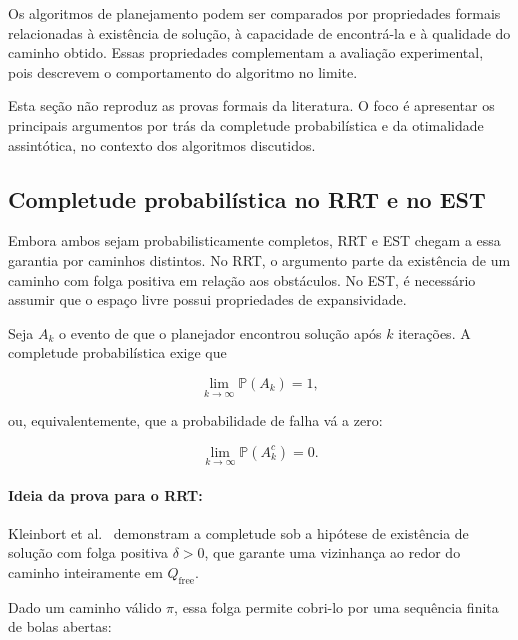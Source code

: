 Os algoritmos de planejamento podem ser comparados por propriedades formais relacionadas à existência de solução, à capacidade de encontrá-la e à qualidade do caminho obtido. Essas propriedades complementam a avaliação experimental, pois descrevem o comportamento do algoritmo no limite.

Esta seção não reproduz as provas formais da literatura. O foco é apresentar os principais argumentos por trás da completude probabilística e da otimalidade assintótica, no contexto dos algoritmos discutidos.

\subsection{Completude probabilística no RRT e no EST}
\label{subsec:completude_rrt_est}

Embora ambos sejam probabilisticamente completos, RRT e EST chegam a essa garantia por caminhos distintos. No RRT, o argumento parte da existência de um caminho com folga positiva em relação aos obstáculos. No EST, é necessário assumir que o espaço livre possui propriedades de expansividade.

Seja $A_k$ o evento de que o planejador encontrou solução após $k$ iterações. A completude probabilística exige que

\begin{equation}
    \lim_{k \rightarrow \infty} \mathbb{P}(A_k) = 1,
    \label{eq:def_completude_probabilistica}
\end{equation}

ou, equivalentemente, que a probabilidade de falha vá a zero:

\begin{equation}
    \lim_{k \rightarrow \infty} \mathbb{P}(A_k^c) = 0.
    \label{eq:def_falha_probabilistica}
\end{equation}

\paragraph{Ideia da prova para o RRT:}

Kleinbort et al.~\cite{kleinbort2022probabilisticcompletenessrrtgeometric} demonstram a completude sob a hipótese de existência de solução com folga positiva $\delta > 0$, que garante uma vizinhança ao redor do caminho inteiramente em $Q_{\mathrm{free}}$.

Dado um caminho válido $\pi$, essa folga permite cobri-lo por uma sequência finita de bolas abertas:

